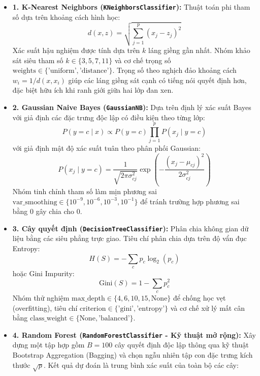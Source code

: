 \documentclass[13pt,a4paper]{extarticle}
\begin{document}
\begin{itemize}
    \item \textbf{1. K-Nearest Neighbors (\texttt{KNeighborsClassifier}):} Thuật toán phi tham số dựa trên khoảng cách hình học:
    \begin{equation}
    d(x, z) = \sqrt{\sum_{j=1}^p (x_j - z_j)^2}
    \end{equation}
    Xác suất hậu nghiệm được tính dựa trên $k$ láng giềng gần nhất. Nhóm khảo sát siêu tham số $k \in \{3, 5, 7, 11\}$ và cơ chế trọng số $\text{weights} \in \{\text{'uniform'}, \text{'distance'}\}$. Trọng số theo nghịch đảo khoảng cách $w_i = 1 / d(x, x_i)$ giúp các láng giềng sát cạnh có tiếng nói quyết định hơn, đặc biệt hữu ích khi ranh giới giữa hai lớp đan xen.
    \item \textbf{2. Gaussian Naive Bayes (\texttt{GaussianNB}):} Dựa trên định lý xác suất Bayes với giả định các đặc trưng độc lập có điều kiện theo từng lớp:
    \begin{equation}
    P(y = c \mid x) \propto P(y = c) \prod_{j=1}^p P(x_j \mid y = c)
    \end{equation}
    với giả định mật độ xác suất tuân theo phân phối Gaussian:
    \begin{equation}
    P(x_j \mid y = c) = \frac{1}{\sqrt{2\pi \sigma_{cj}^2}} \exp\left(-\frac{(x_j - \mu_{cj})^2}{2\sigma_{cj}^2}\right)
    \end{equation}
    Nhóm tinh chỉnh tham số làm mịn phương sai $\text{var\_smoothing} \in \{10^{-9}, 10^{-6}, 10^{-3}, 10^{-1}\}$ để tránh trường hợp phương sai bằng 0 gây chia cho 0.
    \item \textbf{3. Cây quyết định (\texttt{DecisionTreeClassifier}):} Phân chia không gian dữ liệu bằng các siêu phẳng trực giao. Tiêu chí phân chia dựa trên độ vẩn đục Entropy:
    \begin{equation}
    H(S) = - \sum_{c} p_c \log_2(p_c)
    \end{equation}
    hoặc Gini Impurity:
    \begin{equation}
    \text{Gini}(S) = 1 - \sum_{c} p_c^2
    \end{equation}
    Nhóm thử nghiệm $\text{max\_depth} \in \{4, 6, 10, 15, \text{None}\}$ để chống học vẹt (overfitting), tiêu chí $\text{criterion} \in \{\text{'gini'}, \text{'entropy'}\}$ và cơ chế xử lý mất cân bằng $\text{class\_weight} \in \{\text{None}, \text{'balanced'}\}$.
    \item \textbf{4. Random Forest (\texttt{RandomForestClassifier} - Kỹ thuật mở rộng):} Xây dựng một tập hợp gồm $B = 100$ cây quyết định độc lập thông qua kỹ thuật Bootstrap Aggregation (Bagging) và chọn ngẫu nhiên tập con đặc trưng kích thước $\sqrt{p}$. Kết quả dự đoán là trung bình xác suất của toàn bộ các cây:

\end{itemize}
\end{document}
